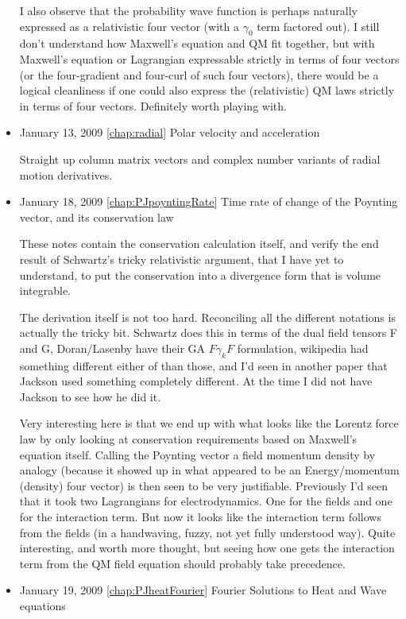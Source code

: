 \begin{itemize}
I also observe that the probability wave function is perhaps naturally expressed as a relativistic four vector (with a $\gamma_0$ term factored out).  I still don't understand how Maxwell's equation and QM fit together, but with Maxwell's equation or Lagrangian expressable strictly in terms of four vectors (or the four-gradient and four-curl of such four vectors), there would be a logical cleanliness if one could also express the (relativistic) QM laws strictly in terms of four vectors.  Definitely worth playing with. 
\item January 13, 2009 \ref{chap:radial} Polar velocity and acceleration

Straight up column matrix vectors and complex number variants of radial motion derivatives. \item January 18, 2009 \ref{chap:PJpoyntingRate} Time rate of change of the Poynting vector, and its conservation law

These notes contain the conservation calculation itself, and verify the end result of Schwartz's tricky relativistic argument, that I have yet to understand, to put the conservation into a divergence form that is volume integrable. 

The derivation itself is not too hard.  Reconciling all the different notations is actually the tricky bit.  Schwartz does this in terms of the dual field tensors F and G, Doran/Lasenby have their GA $F \gamma_k F$ formulation, wikipedia had something different either of than those, and I'd seen in another paper that Jackson used something completely different.  At the time I did not have Jackson to see how he did it. 

Very interesting here is that we end up with what looks like the Lorentz force law by only looking at conservation requirements based on Maxwell's equation itself.  Calling the Poynting vector a field momentum density by analogy (because it showed up in what appeared to be an Energy/momentum (density) four vector) is then seen to be very justifiable.  Previously I'd seen that it took two Lagrangians for electrodynamics.  One for the fields and one for the interaction term.  But now it looks like the interaction term follows from the fields (in a handwaving, fuzzy, not yet fully understood way).  Quite interesting, and worth more thought, but seeing how one gets the interaction term from the QM field equation should probably take precedence. 
\item January 19, 2009 \ref{chap:PJheatFourier} Fourier Solutions to Heat and Wave equations


\end{itemize}
